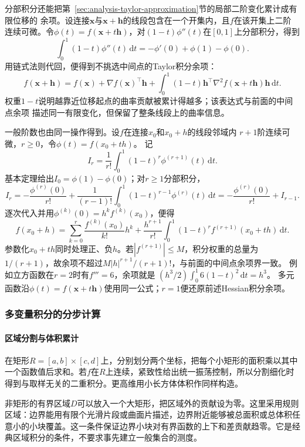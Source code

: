 分部积分还能把第~\ref{sec:analysis-taylor-approximation}节的局部二阶变化累计成有限位移的
余项。设连接$\bm{x}$与$\bm{x}+\bm{h}$的线段包含在一个开集内，且$f$在该开集上二阶
连续可微。令$\phi(t)=f(\bm{x}+t\bm{h})$，对$(1-t)\phi''(t)$在$[0,1]$上分部积分，得到
\[
  \int_0^1(1-t)\phi''(t)\,\mathrm{d}t
  =-\phi'(0)+\phi(1)-\phi(0).
\]
用链式法则代回，便得到不挑选中间点的Taylor积分余项：
\[   f(\bm{x}+\bm{h})   =   f(\bm{x})   +\nabla f(\bm{x})^{\top}\bm{h}   +   \int_0^1(1-t)   \bm{h}^{\top}\nabla^2f(\bm{x}+t\bm{h})\bm{h}\,\mathrm{d}t. \]
权重$1-t$说明越靠近位移起点的曲率贡献被累计得越多；该表达式与前面的中间点余项
描述同一有限变化，但保留了整条线段上的曲率信息。

一般阶数也由同一操作得到。设$f$在连接$x_0$和$x_0+h$的线段邻域内
$r+1$阶连续可微，$r\geq0$，令$\phi(t)=f(x_0+th)$。
记
\[
 I_r=\frac1{r!}\int_0^1(1-t)^r\phi^{(r+1)}(t)\,\mathrm dt.
\]
基本定理给出$I_0=\phi(1)-\phi(0)$；对$r\geq1$分部积分，
\[
 I_r=-\frac{\phi^{(r)}(0)}{r!}
       +\frac1{(r-1)!}\int_0^1(1-t)^{r-1}\phi^{(r)}(t)\,\mathrm dt
     =-\frac{\phi^{(r)}(0)}{r!}+I_{r-1}.
\]
逐次代入并用$\phi^{(k)}(0)=h^k f^{(k)}(x_0)$，便得
\begin{equation}
 f(x_0+h)=\sum_{k=0}^r\frac{f^{(k)}(x_0)}{k!}h^k
 +\frac{h^{r+1}}{r!}
   \int_0^1(1-t)^r f^{(r+1)}(x_0+th)\,\mathrm dt.
\label{eq:analysis-taylor-integral-remainder}
\end{equation}
参数化$x_0+th$同时处理正、负$h$。若$|f^{(r+1)}|\leq M$，积分权重的总量为
$1/(r+1)$，故余项不超过$M|h|^{r+1}/(r+1)!$，与前面的中间点余项界一致。
例如立方函数在$r=2$时有$f'''=6$，余项就是
$(h^3/2)\int_0^1 6(1-t)^2\,\mathrm dt=h^3$。
多元函数沿$\phi(t)=f(\bm x+t\bm h)$使用同一公式；$r=1$便还原前述Hessian积分余项。

\subsubsection{多变量积分的分步计算}

\paragraph{区域分割与体积累计}

在矩形$R=[a,b]\times[c,d]$上，分别划分两个坐标，把每个小矩形的面积乘以其中一个函数值后求和。若$f$在$R$上连续，紧致性给出统一振荡控制，所以分割细化时得到与取样无关的二重积分。更高维用小长方体体积作同样构造。

非矩形的有界区域$D$可以放入一个大矩形，把区域外的贡献设为零。这里采用规则区域：边界能用有限个光滑片段或曲面片描述，边界附近能够被总面积或总体积任意小的小块覆盖。这一条件保证边界小块对有界函数的上下和差贡献趋零。它是经典区域积分的条件，不要求事先建立一般集合的测度。

